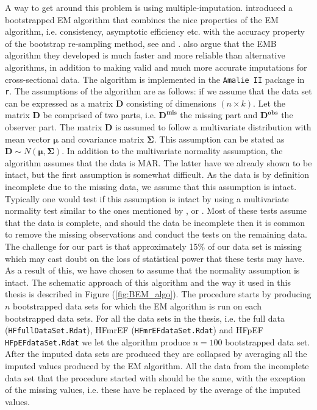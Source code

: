 \documentclass[../thesis.tex]{subfiles}
\begin{document}
\indent A way to get around this problem is using multiple-imputation. \cite{honaker2011amelia}  introduced a bootstrapped EM algorithm that combines the nice properties of the EM algorithm, i.e. consistency, asymptotic efficiency etc. with the accuracy property of the bootstrap re-sampling method, see \cite{efron1992bootstrap} and \cite{james2013introduction}. \cite{honaker2011amelia} also argue that the EMB algorithm they developed is much faster and more reliable than alternative algorithms, in addition to making valid and much more accurate imputations for cross-sectional data. The algorithm is implemented in the \texttt{Amalie II} package in \texttt{r}. The assumptions of the algorithm are as follows: if we assume that the data set can be expressed as a matrix $\boldsymbol{D}$ consisting of dimensions $(n\times k)$. Let the matrix $\boldsymbol{D}$ be comprised of two parts, i.e. $\boldsymbol{D^{mis}}$ the missing part and $\boldsymbol{D^{obs}}$ the observer part. The matrix $\boldsymbol{D}$ is assumed to follow a multivariate distribution with mean vector $\boldsymbol{\mu}$ and covariance matrix $\boldsymbol{\Sigma}$. This assumption can be stated as $\boldsymbol{D} \sim N\left(\boldsymbol{\mu},  \boldsymbol{\Sigma}\right)$. In addition to the multivariate normality assumption, the algorithm assumes that the data is MAR. The latter have we already shown to be intact, but the first assumption is somewhat difficult. As the data is by definition incomplete due to the missing data, we assume that this assumption is intact. Typically one would test if this assumption is intact by using a multivariate normality test similar to the ones mentioned by \cite{mardia1970measures}, \cite{henze1990class} or \cite{royston1982extension}. Most of these tests assume that the data is complete, and should the data be incomplete then it is common to remove the missing observations and conduct the tests on the remaining data. The challenge for our part is that approximately 15\% of our data set is missing which may cast doubt on the loss of statistical power that these tests may have. As a result of this, we have chosen to assume that the normality assumption is intact. The schematic approach of this algorithm and the way it used in this thesis is described in Figure (\ref{fig:BEM_algo}). The procedure starts by producing $n$ bootstrapped data sets for which the EM algorithm is run on each bootstrapped data sets.  For all the data sets in the thesis, i.e. the full data (\texttt{HFfullDataSet.Rdat}), HFmrEF (\texttt{HFmrEFdataSet.Rdat}) and HFpEF \texttt{HFpEFdataSet.Rdat} we let the algorithm produce $n = 100$ bootstrapped data set. After the imputed data sets are produced they are collapsed by averaging all the imputed values produced by the EM algorithm. All the data from the incomplete data set that the procedure started with should be the same, with the exception of the missing values, i.e. these have be replaced by the average of the imputed values.
\end{document}
